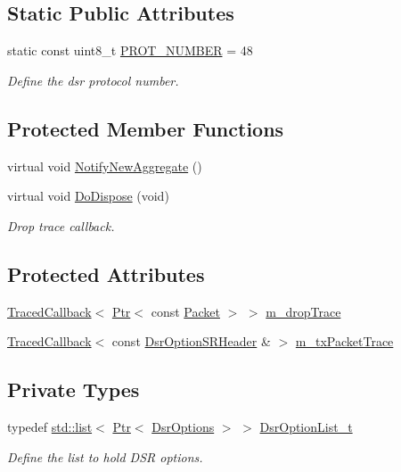 \subsection*{Static Public Attributes}
\begin{DoxyCompactItemize}
\item 
static const uint8\+\_\+t \hyperlink{classns3_1_1dsr_1_1DsrRouting_a66248f69fcf97af91d6fe17d70617cc9}{P\+R\+O\+T\+\_\+\+N\+U\+M\+B\+ER} = 48
\begin{DoxyCompactList}\small\item\em Define the dsr protocol number. \end{DoxyCompactList}\end{DoxyCompactItemize}
\subsection*{Protected Member Functions}
\begin{DoxyCompactItemize}
\item 
virtual void \hyperlink{classns3_1_1dsr_1_1DsrRouting_a7742bf3036dba9f9b24906b959be728e}{Notify\+New\+Aggregate} ()
\item 
virtual void \hyperlink{classns3_1_1dsr_1_1DsrRouting_a278734278728fc569d2d1ba58dcef0b9}{Do\+Dispose} (void)
\begin{DoxyCompactList}\small\item\em Drop trace callback. \end{DoxyCompactList}\end{DoxyCompactItemize}
\subsection*{Protected Attributes}
\begin{DoxyCompactItemize}
\item 
\hyperlink{classns3_1_1TracedCallback}{Traced\+Callback}$<$ \hyperlink{classns3_1_1Ptr}{Ptr}$<$ const \hyperlink{classns3_1_1Packet}{Packet} $>$ $>$ \hyperlink{classns3_1_1dsr_1_1DsrRouting_aacee2c8437c0b61579cfa7a420423e03}{m\+\_\+drop\+Trace}
\item 
\hyperlink{classns3_1_1TracedCallback}{Traced\+Callback}$<$ const \hyperlink{classns3_1_1dsr_1_1DsrOptionSRHeader}{Dsr\+Option\+S\+R\+Header} \& $>$ \hyperlink{classns3_1_1dsr_1_1DsrRouting_a5e0a4e554d0321bd993b532d68931d75}{m\+\_\+tx\+Packet\+Trace}
\end{DoxyCompactItemize}
\subsection*{Private Types}
\begin{DoxyCompactItemize}
\item 
typedef \hyperlink{openflow-interface_8h_afd9bcfa176617760671b67580f536fa7}{std\+::list}$<$ \hyperlink{classns3_1_1Ptr}{Ptr}$<$ \hyperlink{classns3_1_1dsr_1_1DsrOptions}{Dsr\+Options} $>$ $>$ \hyperlink{classns3_1_1dsr_1_1DsrRouting_a44a611adccbcf5776103154d0d2341d1}{Dsr\+Option\+List\+\_\+t}
\begin{DoxyCompactList}\small\item\em Define the list to hold D\+SR options. \end{DoxyCompactList}\end{DoxyCompactItemize}
